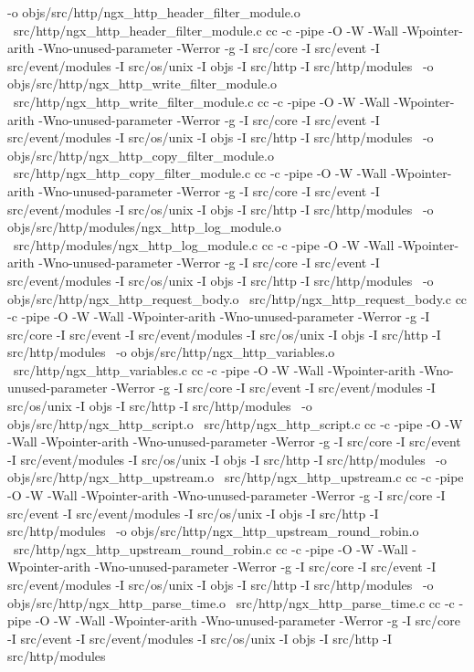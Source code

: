 	-o objs/src/http/ngx_http_header_filter_module.o \
	src/http/ngx_http_header_filter_module.c
cc -c -pipe  -O -W -Wall -Wpointer-arith -Wno-unused-parameter -Werror -g  -I src/core -I src/event -I src/event/modules -I src/os/unix -I objs -I src/http -I src/http/modules \
	-o objs/src/http/ngx_http_write_filter_module.o \
	src/http/ngx_http_write_filter_module.c
cc -c -pipe  -O -W -Wall -Wpointer-arith -Wno-unused-parameter -Werror -g  -I src/core -I src/event -I src/event/modules -I src/os/unix -I objs -I src/http -I src/http/modules \
	-o objs/src/http/ngx_http_copy_filter_module.o \
	src/http/ngx_http_copy_filter_module.c
cc -c -pipe  -O -W -Wall -Wpointer-arith -Wno-unused-parameter -Werror -g  -I src/core -I src/event -I src/event/modules -I src/os/unix -I objs -I src/http -I src/http/modules \
	-o objs/src/http/modules/ngx_http_log_module.o \
	src/http/modules/ngx_http_log_module.c
cc -c -pipe  -O -W -Wall -Wpointer-arith -Wno-unused-parameter -Werror -g  -I src/core -I src/event -I src/event/modules -I src/os/unix -I objs -I src/http -I src/http/modules \
	-o objs/src/http/ngx_http_request_body.o \
	src/http/ngx_http_request_body.c
cc -c -pipe  -O -W -Wall -Wpointer-arith -Wno-unused-parameter -Werror -g  -I src/core -I src/event -I src/event/modules -I src/os/unix -I objs -I src/http -I src/http/modules \
	-o objs/src/http/ngx_http_variables.o \
	src/http/ngx_http_variables.c
cc -c -pipe  -O -W -Wall -Wpointer-arith -Wno-unused-parameter -Werror -g  -I src/core -I src/event -I src/event/modules -I src/os/unix -I objs -I src/http -I src/http/modules \
	-o objs/src/http/ngx_http_script.o \
	src/http/ngx_http_script.c
cc -c -pipe  -O -W -Wall -Wpointer-arith -Wno-unused-parameter -Werror -g  -I src/core -I src/event -I src/event/modules -I src/os/unix -I objs -I src/http -I src/http/modules \
	-o objs/src/http/ngx_http_upstream.o \
	src/http/ngx_http_upstream.c
cc -c -pipe  -O -W -Wall -Wpointer-arith -Wno-unused-parameter -Werror -g  -I src/core -I src/event -I src/event/modules -I src/os/unix -I objs -I src/http -I src/http/modules \
	-o objs/src/http/ngx_http_upstream_round_robin.o \
	src/http/ngx_http_upstream_round_robin.c
cc -c -pipe  -O -W -Wall -Wpointer-arith -Wno-unused-parameter -Werror -g  -I src/core -I src/event -I src/event/modules -I src/os/unix -I objs -I src/http -I src/http/modules \
	-o objs/src/http/ngx_http_parse_time.o \
	src/http/ngx_http_parse_time.c
cc -c -pipe  -O -W -Wall -Wpointer-arith -Wno-unused-parameter -Werror -g  -I src/core -I src/event -I src/event/modules -I src/os/unix -I objs -I src/http -I src/http/modules \

